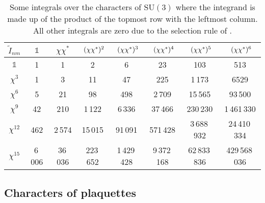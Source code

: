 \begin{table}
  \begin{center}
    \begin{tabular}{*8c} \toprule
      {$\tilde{I}_{nm}$} & $\mathbb{1}$ & $\chi\chi^*$ & $(\chi\chi^*)\mathrlap{^2}$ & $(\chi\chi^*)\mathrlap{^3}$ 
        & $(\chi\chi^*)\mathrlap{^4}$ & $(\chi\chi^*)\mathrlap{^5}$ & $(\chi\chi^*)\mathrlap{^6}$ \\\midrule
      $\mathbb{1}$ & 1 & 1 & 2 & 6 & 23 & 103 & 513 \\
      $\chi^3$ & 1 & 3 & 11 & 47 & 225 & 1\,173 & 6529 \\
      $\chi^6$ & 5 & 21 & 98 & 498 & 2\,709 & 15\,565 & 93\,500 \\
      $\chi^9$ & 42 & 210 & 1\,122 & 6\,336 & 37\,466 & 230\,230 & 1\,461\,330 \\
      $\chi^{12}$ & 462 & 2\,574 & 15\,015 & 91\,091 & 571\,428  & 3\,688\,932 & 24\,410\,334 \\
      $\chi^{15}$ & 6\,006 & 36\,036 & 223\,652 & 1\,429\,428 & 9\,372\,168 & 62\,833\,836 & 429\,568\,036 \\\bottomrule
    \end{tabular}
  \end{center}
  \caption{Some integrals over the characters of SU$(3)$ where the integrand is made
    up of the product of the topmost row with the leftmost column. All other
    integrals are zero due to the selection rule of
    \protect{}.}
  \label{tab-character-integrals}
\end{table}

\subsection{Characters of plaquettes}

